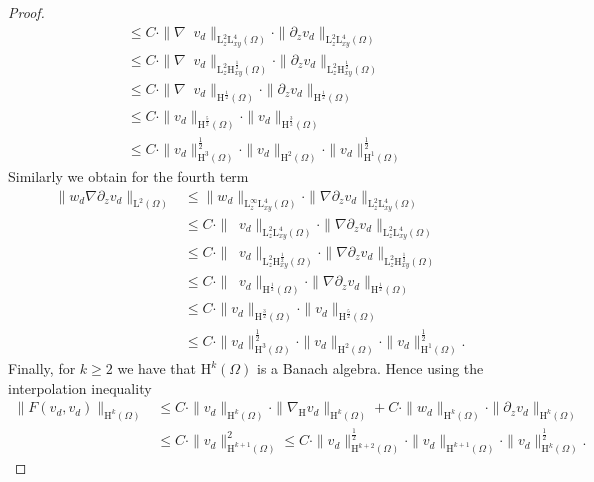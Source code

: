 \documentclass[preprint]{elsarticle}
\numberwithin{equation}{section}
\DeclareMathOperator{\divH}{div_{\H}}
\renewcommand{\H}{\mathrm{H}}
\newcommand{\nablaH}{\nabla_{\H}}
\newcommand{\rL}{\mathrm{L}}
\newcommand{\rH}{\H}
\begin{document}
\begin{proof}
\begin{align*}
		&\leq C \cdot \| \nabla \divH v_d \|_{\rL^2_z \rL^4_{xy}(\Omega)} \cdot \| \partial_z v_d \|_{\rL^2_z \rL^4_{xy}(\Omega)} \\
		&\leq C \cdot \| \nabla \divH v_d \|_{\rL^2_z \rH^{\frac{1}{2}}_{xy}(\Omega)} \cdot \| \partial_z v_d \|_{\rL^2_z \rH^{\frac{1}{2}}_{xy}(\Omega)} \\
		&\leq C \cdot \| \nabla \divH v_d \|_{\rH^{\frac{1}{2}}(\Omega)} \cdot \| \partial_z v_d \|_{\rH^{\frac{1}{2}}(\Omega)} \\
		&\leq C \cdot \| v_d \|_{\rH^{\frac{5}{2}}(\Omega)} \cdot 
		\| v_d \|_{\rH^{\frac{3}{2}}(\Omega)} \\
		&\leq  C \cdot 
		\| v_d \|_{\rH^{3}(\Omega)}^{\frac{1}{2}} \cdot \| v_d \|_{\rH^{2}(\Omega)} \cdot 
		\| v_d \|_{\rH^{1}(\Omega)}^{\frac{1}{2}} 
	\end{align*}
	Similarly we obtain for the fourth term 
	\begin{align*}
		\| w_d \nabla \partial_z v_d \|_{\rL^2(\Omega)}
		&\leq \| w_d \|_{\rL^\infty_z \rL^4_{xy}(\Omega)} \cdot \| \nabla \partial_z v_d \|_{\rL^2_z \rL^4_{xy}(\Omega)} \\
		&\leq C \cdot \| \divH v_d \|_{\rL^2_z \rL^4_{xy}(\Omega)} \cdot \| \nabla \partial_z v_d \|_{\rL^2_z \rL^4_{xy}(\Omega)} \\
		&\leq C \cdot \| \divH v_d \|_{\rL^2_z \rH^{\frac{1}{2}}_{xy}(\Omega)} \cdot \| \nabla \partial_z v_d \|_{\rL^2_z \rH^{\frac{1}{2}}_{xy}(\Omega)} \\
		&\leq C \cdot \| \divH v_d \|_{\rH^{\frac{1}{2}}(\Omega)} \cdot \| \nabla \partial_z v_d \|_{\rH^{\frac{1}{2}}(\Omega)} \\
		&\leq C \cdot \| v_d \|_{\rH^{\frac{3}{2}}(\Omega)} \cdot \| v_d \|_{\rH^{\frac{5}{2}}(\Omega)} \\
		&\leq  C \cdot \| v_d \|_{\rH^{3}(\Omega)}^{\frac{1}{2}} \cdot \| v_d \|_{\rH^{2}(\Omega)} \cdot \| v_d \|_{\rH^{1}(\Omega)}^{\frac{1}{2}} .
	\end{align*}
	Finally, for $k \geq 2$ we have that $\rH^k(\Omega)$ is a Banach algebra. Hence using the interpolation inequality
	\begin{align*}
		\| F (v_d,v_d) \|_{\rH^{k}(\Omega)}
		&\leq C\cdot 
		\| v_d \|_{\rH^{k}(\Omega)} \cdot \| \nablaH v_d \|_{\rH^k(\Omega)}
		+ C \cdot \| w_d \|_{\rH^k(\Omega)} \cdot \| \partial_z v_d \|_{\rH^{k}(\Omega)} 
		\\
		&\leq C \cdot \| v_d \|_{\rH^{k+1}(\Omega)}^2
		\leq C \cdot \| v_d \|_{\rH^{k+2}(\Omega)}^{\frac{1}{2}} \cdot \| v_d \|_{\rH^{k+1}(\Omega)} \cdot \| v_d \|_{\rH^{k}(\Omega)}^{\frac{1}{2}} . 
	\end{align*}
\end{proof}
\end{document}
